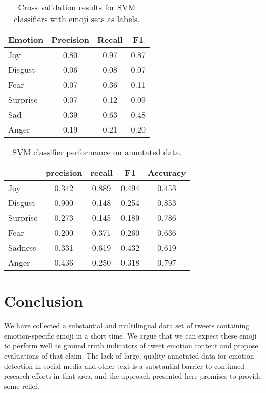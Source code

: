 \documentclass[10pt, a4paper]{article}
\begin{document}
\begin{table}[!ht]
\centering
\begin{tabular}{l | c | c | c}
\textbf{Emotion} & \textbf{Precision}  & \textbf{Recall} & \textbf{F1} \\
\hline
             Joy & 0.80       & 0.97   & 0.87 \\
         Disgust & 0.06       & 0.08   & 0.07 \\
            Fear & 0.07       & 0.36   & 0.11 \\
        Surprise & 0.07       & 0.12   & 0.09 \\
             Sad & 0.39       & 0.63   & 0.48 \\
           Anger & 0.19       & 0.21   & 0.20 \\
\end{tabular}
\caption{Cross validation results for SVM classifiers with emoji sets as labels.}
\label{tab:SVM-CV-results}
\end{table}


\begin{table}[!ht]
\centering
\begin{tabular}{l | c | c | c| c}
             & \textbf{precision} & \textbf{recall} &   \textbf{F1}   & \textbf{Accuracy} \\
\hline
         Joy &   0.342  & 0.889  & 0.494  & 0.453 \\
     Disgust &   0.900  & 0.148  & 0.254  & 0.853 \\
    Surprise &   0.273  & 0.145  & 0.189  & 0.786 \\
        Fear &   0.200  & 0.371  & 0.260  & 0.636 \\
     Sadness &   0.331  & 0.619  & 0.432  & 0.619 \\
       Anger &   0.436  & 0.250  & 0.318  & 0.797 \\

\end{tabular}
\caption{SVM classifier performance on annotated data. }
\label{tab:svm-annot-predict}
\end{table}



\section{Conclusion}

We have collected a substantial and multilingual data set of tweets containing emotion-specific emoji in a short time. We argue that we can expect these emoji to perform well as ground truth indicators of tweet emotion content and propose evaluations of that claim. 
The lack of large, quality annotated data for emotion detection in social media and other text is a substantial barrier to continued research efforts in that area, and the approach presented here promises to provide some relief.
\end{document}
